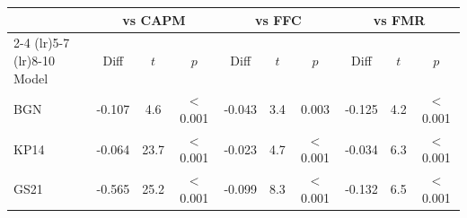\begin{tabular}{l c c c c c c c c c}
\toprule
& \multicolumn{3}{c}{vs CAPM} & \multicolumn{3}{c}{vs FFC} & \multicolumn{3}{c}{vs FMR} \\
\cmidrule(lr){2-4} \cmidrule(lr){5-7} \cmidrule(lr){8-10}
Model & Diff & $t$ & $p$ & Diff & $t$ & $p$ & Diff & $t$ & $p$ \\
\midrule
BGN & -0.107 & 4.6 & $<$0.001 & -0.043 & 3.4 & 0.003 & -0.125 & 4.2 & $<$0.001 \\
KP14 & -0.064 & 23.7 & $<$0.001 & -0.023 & 4.7 & $<$0.001 & -0.034 & 6.3 & $<$0.001 \\
GS21 & -0.565 & 25.2 & $<$0.001 & -0.099 & 8.3 & $<$0.001 & -0.132 & 6.5 & $<$0.001 \\
\bottomrule
\end{tabular}